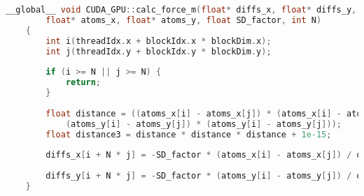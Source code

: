 \begin{lstlisting}[language=C]
    __global__ void CUDA_GPU::calc_force_m(float* diffs_x, float* diffs_y, 
        float* atoms_x, float* atoms_y, float SD_factor, int N)
    {
        int i(threadIdx.x + blockIdx.x * blockDim.x);
        int j(threadIdx.y + blockIdx.y * blockDim.y);
    
        if (i >= N || j >= N) {
            return;
        }
    
        float distance = ((atoms_x[i] - atoms_x[j]) * (atoms_x[i] - atoms_x[j]) +
            (atoms_y[i] - atoms_y[j]) * (atoms_y[i] - atoms_y[j]));
        float distance3 = distance * distance * distance + 1e-15;
    
        diffs_x[i + N * j] = -SD_factor * (atoms_x[i] - atoms_x[j]) / distance3;
    
        diffs_y[i + N * j] = -SD_factor * (atoms_y[i] - atoms_y[j]) / distance3;
    }
\end{lstlisting}